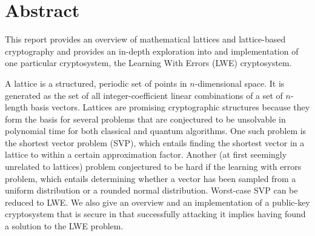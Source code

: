 \section{Abstract}\label{sec:abstract}
This report provides an overview of mathematical lattices and 
lattice-based cryptography and provides an in-depth exploration
into and implementation of one particular cryptosystem, the 
Learning With Errors (LWE) cryptosystem. 

A lattice is a structured, periodic set of points in $n$-dimensional
space. It is generated as the set of all integer-coefficient linear
combinations of a set of $n$-length basis vectors. Lattices are promising
cryptographic structures because they form the basis for several problems
that are conjectured to be unsolvable in polynomial time for both 
classical and quantum algorithms. One such problem is the shortest
vector problem (SVP), which entails finding the shortest vector in
a lattice to within a certain approximation factor. Another (at first seemingly unrelated to lattices) problem conjectured to be hard if the learning with errors problem, which entails determining whether a vector has been
sampled from a uniform distribution or a rounded normal distribution. Worst-case SVP can be reduced to LWE. We also give an overview and an implementation
of a public-key cryptosystem that is secure in that successfully attacking
it implies having found a solution to the LWE problem.
